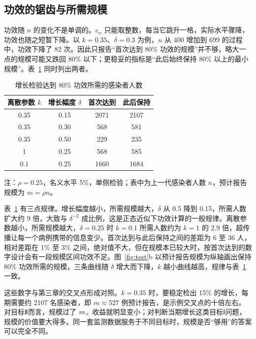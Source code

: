 \subsection{功效的锯齿与所需规模}

功效随 $n$ 的变化不是单调的。$c_\alpha$ 只能取整数，每当它跳升一格，实际水平骤降，功效也随之短暂下降。以 $k=0.35$、$\delta=0.3$ 为例，$n$ 从 400 增加到 699 的过程中，功效下降了 82 次。因此只报告“首次达到 80\% 功效的规模”并不够，略大一点的规模可能又跌回 80\% 以下；更稳妥的指标是“此后始终保持 80\% 以上的最小规模”。表~\ref{tab:power-n} 同时列出两者。

\begin{table}[!tbp]
  \centering
  \caption{增长检验达到 80\% 功效所需的感染者人数}
  \label{tab:power-n}
  \begin{tabular}{@{}cccc@{}}
    \toprule
    离散参数 $k$ & 增长幅度 $\delta$ & 首次达到 & 此后保持 \\
    \midrule
    0.35 & 0.15 & 2071 & 2107 \\
    0.35 & 0.30 & 568 & 581 \\
    0.35 & 0.50 & 229 & 235 \\
    1 & 0.25 & 568 & 585 \\
    0.1 & 0.25 & 1660 & 1684 \\
    \bottomrule
  \end{tabular}

  \vspace{4pt}
  {\small 注：$\rho=0.25$，名义水平 5\%，单侧检验；表中为上一代感染者人数 $n$，预计报告规模为 $m=\rho n$。}
\end{table}

表~\ref{tab:power-n} 有三点规律。增长幅度越小，所需规模越大，$\delta$ 从 0.5 降到 0.15，所需人数扩大约 9 倍，大致与 $\delta^{-2}$ 成比例，这是正态近似下功效计算的一般规律。离散参数越小，所需规模越大，$\delta=0.25$ 时 $k=0.1$ 所需人数约为 $k=1$ 的 2.9 倍，超传播让每一个病例携带的信息变少。首次达到与此后保持之间的差距为 6 至 36 人，相对差距在 1\% 至 3\% 之间，绝对值不大，但在规模本已较大时，按首次达到的数字设计会有一段规模区间功效不足。图~\ref{fig:test}b 以预计报告规模为纵轴画出保持 80\% 功效所需的规模，三条曲线随 $\delta$ 增大而下降，$k$ 越小曲线越高，规律与表~\ref{tab:power-n} 一致。

这些数字与第三章的交叉点形成对照。$k=0.35$ 时，要稳定检出 15\% 的增长，每期需要约 2107 名感染者，即 $m\approx527$ 例预计报告，是示例交叉点的十倍左右。对目标Ⅱ而言，规模过了 $m_{\times}$ 收益就明显变小；对判断当期增长这类目标Ⅰ问题，规模的价值要大得多。同一套监测数据服务于不同目标时，规模是否“够用”的答案可以完全不同。


